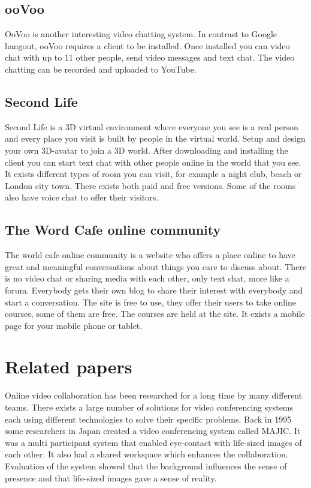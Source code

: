 \documentclass[12pt, titlepage]{article}
\begin{document}
\subsection{ooVoo}
OoVoo\cite{7} is another interesting video chatting system. In contrast to Google hangout, ooVoo requires a client to be installed. Once installed you can video chat with up to 11 other people, send video messages and text chat. The video chatting can be recorded and uploaded to YouTube.
\subsection{Second Life}
Second Life\cite{3} is a 3D virtual environment where everyone you see is a real person and every place you visit is built by people in the virtual world. Setup and design your own 3D-avatar to join a 3D world. After downloading and installing the client you can start text chat with other people online in the world that you see. It exists different types of room you can visit, for example a night club, beach or London city town. There exists both paid and free versions. Some of the rooms also have voice chat to offer their visitors.
\subsection{The Word Cafe online community}
The world cafe online community\cite{8} is a website who offers a place online to have great and meaningful conversations about things you care to discuss about. There is no video chat or sharing media with each other, only text chat, more like a forum. Everybody gets their own blog to share their interest with everybody and start a conversation. The site is free to use, they offer their users to take online courses, some of them are free. The courses are held at the site. It exists a mobile page for your mobile phone or tablet.

\section{Related papers}
Online video collaboration has been researched for a long time by many different teams. There exists a large number of solutions for video conferencing systems each using different technologies to solve their specific problems. Back in 1995 some researchers in Japan created a video conferencing system called MAJIC\cite{17}. It was a multi participant system that enabled eye-contact with life-sized images of each other. It also had a shared workspace which enhances the collaboration. Evaluation of the system showed that the background influences the sense of presence and that life-sized images gave a sense of reality.
\end{document}
